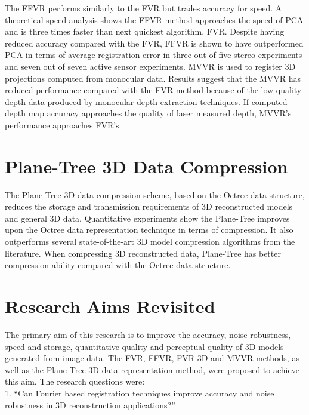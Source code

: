 The FFVR performs similarly to the FVR but trades accuracy for speed. A theoretical speed analysis shows the FFVR method approaches the speed of PCA and is three times faster than next quickest algorithm, FVR. Despite having reduced accuracy compared with the FVR, FFVR is shown to have outperformed PCA in terms of average registration error in three out of five stereo experiments and seven out of seven active sensor experiments. MVVR is used to register 3D projections computed from monocular data. Results suggest that the MVVR has reduced performance compared with the FVR method because of the low quality depth data produced by monocular depth extraction techniques. If computed depth map accuracy approaches the quality of laser measured depth, MVVR's performance approaches FVR's. \\


\section{Plane-Tree 3D Data Compression}
\label{Sec:ConcPT}

The Plane-Tree 3D data compression scheme, based on the Octree data structure, reduces the storage and transmission requirements of 3D reconstructed models and general 3D data. Quantitative experiments show the Plane-Tree improves upon the Octree data representation technique in terms of compression. It also outperforms several state-of-the-art 3D model compression algorithms from the literature. When compressing 3D reconstructed data, Plane-Tree has better compression ability compared with the Octree data structure. \\

\section{Research Aims Revisited}

The primary aim of this research is to improve the accuracy, noise robustness, speed and storage, quantitative quality and perceptual quality of 3D models generated from image data. The FVR, FFVR, FVR-3D and MVVR methods, as well as the Plane-Tree 3D data representation method, were proposed to achieve this aim. The research questions were: \\

1. ``Can Fourier based registration techniques improve accuracy and noise robustness in 3D reconstruction applications?'' \\

